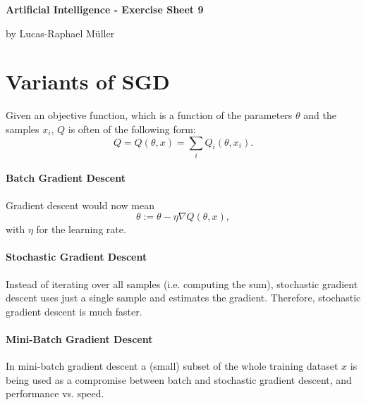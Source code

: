 \documentclass[11pt,a4paper,oneside]{article}
\begin{document}

\renewcommand\thesubsection{\alph{subsection})}

\centerline{\LARGE \textbf{Artificial Intelligence - Exercise Sheet 9}}\vspace{0.5em}
\centerline{\large by Lucas-Raphael Müller}\vspace{2em}


\section{Variants of SGD}
Given an objective function, which is a function of the parameters $\theta$ and the samples ${x_i}$, $Q$ is often of the following form:
\begin{equation}
	Q = Q(\theta, x) = \sum\limits_i Q_i(\theta, x_i).
\end{equation}
\paragraph{Batch Gradient Descent} Gradient descent would now mean
\begin{equation}
	\theta := \theta - \eta \nabla Q(\theta, x),
\end{equation}
with $\eta$ for the learning rate.

\paragraph{Stochastic Gradient Descent} Instead of iterating over all samples (i.e. computing the sum), stochastic gradient descent uses just a single sample and estimates the gradient.
Therefore, stochastic gradient descent is much faster.

\paragraph{Mini-Batch Gradient Descent} In mini-batch gradient descent a (small) subset of the whole training dataset $x$ is being used as a compromise between batch and stochastic gradient descent, and performance vs. speed.
\end{document}
